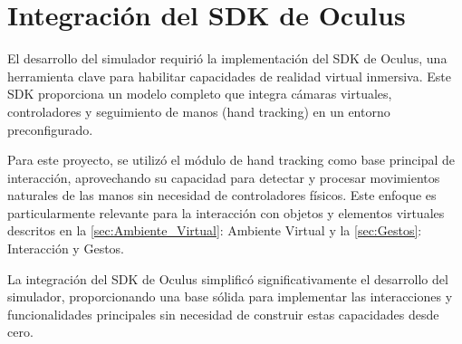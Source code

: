 \section{Integración del SDK de Oculus}
El desarrollo del simulador requirió la implementación del SDK de Oculus, una herramienta clave para habilitar capacidades de realidad virtual inmersiva. Este SDK proporciona un modelo completo que integra cámaras virtuales, controladores y seguimiento de manos (hand tracking) en un entorno preconfigurado.

Para este proyecto, se utilizó el módulo de hand tracking como base principal de interacción, aprovechando su capacidad para detectar y procesar movimientos naturales de las manos sin necesidad de controladores físicos. Este enfoque es particularmente relevante para la interacción con objetos y elementos virtuales descritos en la \autoref{sec:Ambiente_Virtual}: Ambiente Virtual y la \autoref{sec:Gestos}: Interacción y Gestos.

La integración del SDK de Oculus simplificó significativamente el desarrollo del simulador, proporcionando una base sólida para implementar las interacciones y funcionalidades principales sin necesidad de construir estas capacidades desde cero.